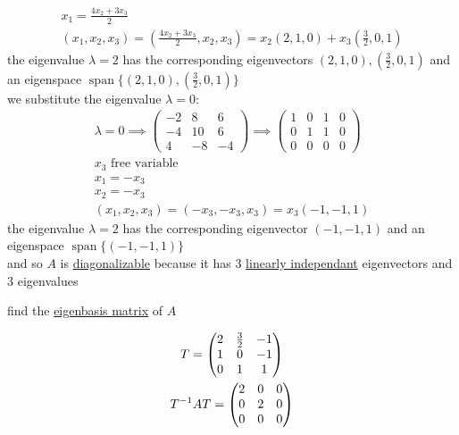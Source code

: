 \documentclass[a4paper,12pt]{article}
\DeclareMathOperator{\spn}{span}
\begin{document}
\begin{definition}
\begin{question}
\begin{subquestion}
\begin{answer}
\begin{gather*}
  x_1 = \frac{4x_2+3x_3}{2}\\
  (x_1,x_2,x_3) = \left(\frac{4x_2+3x_3}{2},x_2,x_3\right) = x_2(2,1,0) + x_3\left(\frac{3}{2},0,1\right)
\end{gather*}
the eigenvalue \(\lambda = 2\) has the corresponding eigenvectors \((2,1,0),\left(\frac{3}{2},0,1\right)\) and an eigenspace \(\spn\{(2,1,0),\left(\frac{3}{2},0,1\right)\}\)\\
we substitute the eigenvalue \(\lambda = 0\):\\
\begin{gather*}
  \lambda = 0 \implies \begin{pmatrix} -2 & 8 & 6\\ -4 & 10 & 6\\ 4 & -8 & -4 \end{pmatrix} \implies \left(\begin{array}{ccc|c} 1 & 0 & 1 & 0\\ 0 & 1 & 1 & 0\\ 0 & 0 & 0 & 0 \end{array}\right)\\
  x_3 \text{ free variable}\\
  x_1 = -x_3\\
  x_2 = -x_3\\
  (x_1,x_2,x_3) = (-x_3,-x_3,x_3) = x_3(-1,-1,1)
\end{gather*}
the eigenvalue \(\lambda = 2\) has the corresponding eigenvector \((-1,-1,1)\) and an eigenspace \(\spn\{(-1,-1,1)\}\)\\
and so \(A\) is \hyperref[sec:org136aa39]{diagonalizable} because it has 3 \hyperref[sec:org174d95a]{linearly independant} eigenvectors and 3 eigenvalues\\
\end{answer}
\end{subquestion}

\begin{subquestion}
find the \hyperref[sec:org136aa39]{eigenbasis matrix} of \(A\)\\
\begin{answer}
\begin{gather*}
  T = \pmqty{2 & \frac32 & -1\\ 1 & 0 & -1\\ 0 & 1 & 1}\\
  T^{-1}AT = \pmqty{2 & 0 & 0\\ 0 & 2 & 0\\ 0 & 0 & 0}
\end{gather*}
\end{answer}
\end{subquestion}


\end{question}
\end{definition}
\end{document}
